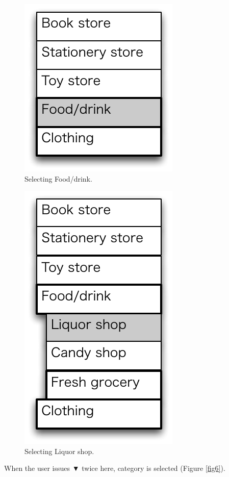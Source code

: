\documentclass[conference]{IEEEtran}
\def\down{▼}
\begin{document}
\begin{figure}[H]
\centerline{\includegraphics[width=\menuwidth,bb=0 0 139 157]{figures/fig4.pdf}}
\caption{Selecting Food/drink.}
\label{fig4}
\end{figure}

\begin{figure}[H]
\centerline{\includegraphics[width=\menuwidth,bb=0 0 139 238]{figures/fig5.pdf}}
\caption{Selecting Liquor shop.}
\label{fig5}
\end{figure}

When the user issues {\down} twice here,
 category is selected (Figure \ref{fig6}).
\end{document}
